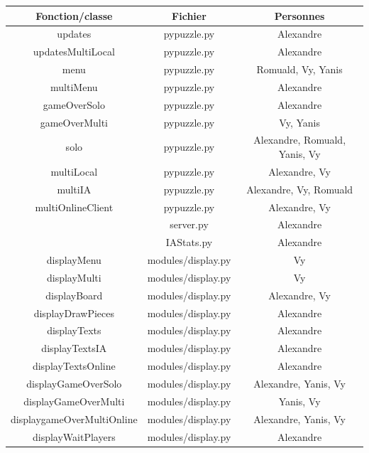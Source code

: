 \documentclass[a4paper]{report}
\begin{document}
\begin{center}
\begin{tabular}{|c|c|c|}\hline   
Fonction/classe				&Fichier		  			&Personnes \\ \hline\hline
updates&      				pypuzzle.py&      			Alexandre\\\hline
updatesMultiLocal&     		pypuzzle.py&      			Alexandre\\\hline
menu&      					pypuzzle.py&      			Romuald, Vy, Yanis\\\hline
multiMenu&      			pypuzzle.py&      			Alexandre\\\hline
gameOverSolo&      			pypuzzle.py&      			Alexandre\\\hline
gameOverMulti&      		pypuzzle.py&      			Vy, Yanis\\\hline
solo&      					pypuzzle.py&      			Alexandre, Romuald, Yanis, Vy\\\hline
multiLocal&      			pypuzzle.py&      			Alexandre, Vy\\\hline
multiIA&      				pypuzzle.py&      			Alexandre, Vy, Romuald\\\hline
multiOnlineClient&      	pypuzzle.py&				Alexandre, Vy\\\hline
&      						server.py&     				Alexandre\\\hline
&							IAStats.py&					Alexandre \\\hline
displayMenu&      			modules/display.py&      	Vy\\\hline
displayMulti&      			modules/display.py&      	Vy\\\hline
displayBoard&      			modules/display.py&      	Alexandre, Vy\\\hline
displayDrawPieces&      	modules/display.py&      	Alexandre\\\hline
displayTexts&      			modules/display.py&      	Alexandre\\\hline
displayTextsIA&      		modules/display.py&      	Alexandre\\\hline
displayTextsOnline&      	modules/display.py&      	Alexandre\\\hline
displayGameOverSolo&      	modules/display.py&      	Alexandre, Yanis, Vy\\\hline
displayGameOverMulti&      	modules/display.py&      	Yanis, Vy\\\hline
displaygameOverMultiOnline& modules/display.py&      	Alexandre, Yanis, Vy\\\hline
displayWaitPlayers&      	modules/display.py&      	Alexandre\\\hline

\end{tabular}
\end{center}
\end{document}
